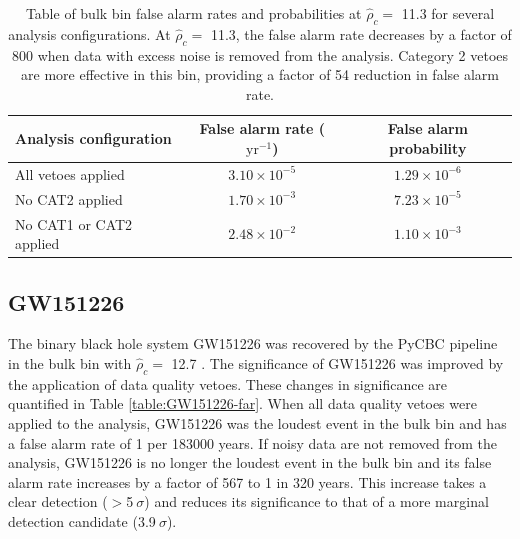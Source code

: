 \begin{table}[!ht]%
  \begin{center}
    \begin{tabular}{lcc}
      \hline
      Analysis configuration & False alarm rate ($\mathrm{yr}^{-1}$) & False alarm probability \\ \hline
      All vetoes applied & $3.10\times10^{-5}$  & $1.29\times10^{-6}$ \\
      No CAT2 applied & $1.70\times10^{-3}$ & $7.23\times10^{-5}$ \\
      No CAT1 or CAT2 applied & $2.48\times10^{-2}$ & $1.10\times10^{-3}$ \\ \hline
    \end{tabular}
  \end{center}
  \caption[Bulk bin FAR - GW151226 analysis]{Table of bulk bin false alarm rates and probabilities at $\hat{\rho}_{c} =$ 11.3 %
           for several analysis configurations. At $\hat{\rho}_{c} =$ 11.3, the false alarm %
           rate decreases by a factor of 800 when data with excess noise is removed from %
           the analysis. Category 2 vetoes are more effective in this bin, providing a factor %
           of 54 reduction in false alarm rate.}
  \label{table:GW151226-bulk-far}
\end{table}

\subsection{GW151226}\label{sec:GW151226}

The binary black hole system GW151226 was recovered by the PyCBC pipeline
in the bulk bin with $\hat{\rho}_{c} =$ 12.7 \cite{GW151226}.
The significance of GW151226 was improved by the application of data quality
vetoes. These changes in significance are quantified in Table \ref{table:GW151226-far}.
When all data quality vetoes were applied to the analysis, GW151226 was the loudest
event in the bulk bin and has a false alarm rate of 1 per 183000 years.
If noisy data are not removed from the analysis, GW151226 is no longer the loudest
event in the bulk bin and its false alarm rate increases by a factor of 567
to 1 in 320 years. This
increase takes a clear detection ($>$5$~\sigma$) and reduces its significance to
that of a more marginal detection candidate (3.9$~\sigma$).

